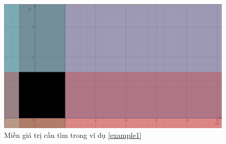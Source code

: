 \begin{answ}
\begin{figure}[h]
		\includegraphics[width=1\columnwidth]{books/artificial-neural-network/chapter01/figure/example 1_graph.png}
		\centering
	\caption{Miền giá trị cần tìm trong ví dụ \ref{example1}}
	\label{fig:example1graph}
\end{figure}
\end{answ}

